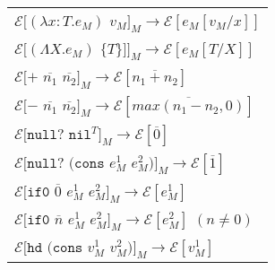 \begin{figure}[p]
\centering
\begin{tabular}{l}
\vspace{5pt}

$\mathscr{E}[(\lambda x:T.e_{M})$ $v_{M}]_{M}\rightarrow\mathscr{E}[e_{M}[v_{M}/x]]$ \\

\vspace{5pt}

$\mathscr{E}[(\Lambda X.e_{M})$ $\lbrace T\rbrace]]_{M}\rightarrow\mathscr{E}[e_{M}[T/X]]$ \\

\vspace{5pt}

$\mathscr{E}[+$ $\overline{n_{1}}$ $\overline{n_{2}}]_{M}\rightarrow\mathscr{E}[\overline{n_{1}+n_{2}}]$ \\

\vspace{5pt}

$\mathscr{E}[-$ $\overline{n_{1}}$ $\overline{n_{2}}]_{M}\rightarrow\mathscr{E}[\overline{max(n_{1}-n_{2},0)}]$ \\

\vspace{5pt}

$\mathscr{E}[\mathtt{null?}$ $\mathtt{nil}^{T}]_{M}\rightarrow\mathscr{E}[\overline{0}]$ \\

\vspace{5pt}

$\mathscr{E}[\mathtt{null?}$ $(\mathtt{cons}$ $e_{M}^{1}$ $e_{M}^{2})]_{M}\rightarrow\mathscr{E}[\overline{1}]$ \\

\vspace{5pt}

$\mathscr{E}[\mathtt{if0}$ $\overline{0}$ $e_{M}^{1}$ $e_{M}^{2}]_{M}\rightarrow\mathscr{E}[e_{M}^{1}]$ \\

\vspace{5pt}

$\mathscr{E}[\mathtt{if0}$ $\overline{n}$ $e_{M}^{1}$ $e_{M}^{2}]_{M}\rightarrow\mathscr{E}[e_{M}^{2}]$ $(n\neq0)$ \\

\vspace{5pt}

$\mathscr{E}[\mathtt{hd}$ $(\mathtt{cons}$ $v_{M}^{1}$ $v_{M}^{2})]_{M}\rightarrow\mathscr{E}[v_{M}^{1}]$ \\


\end{tabular}
\end{figure}
